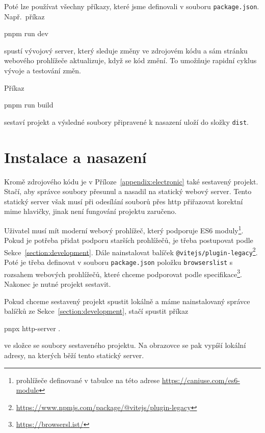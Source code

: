 Poté lze používat všechny příkazy, které jsme definovali v souboru \texttt{package.json}.
Např.~příkaz
\begin{command}
pnpm run dev
\end{command}
spustí vývojový server, který sleduje změny ve zdrojovém kódu a sám stránku webového prohlížeče aktualizuje, když se kód změní.
To umožňuje rapidní cyklus vývoje a testování změn.

Příkaz
\begin{command}
pnpm run build
\end{command}
sestaví projekt a výsledné soubory připravené k nasazení uloží do složky \texttt{dist}.

\section{Instalace a nasazení}

Kromě zdrojového kódu je v Příloze~\ref{appendix:electronic} také sestavený projekt.
Stačí, aby správce soubory přesunul a nasadil na statický webový server.
Tento statický server však musí při odesílání souborů přes \acrshort{http} přiřazovat korektní \acrshort{mime} hlavičky, jinak není fungování projektu zaručeno.

Uživatel musí mít moderní webový prohlížeč, který podporuje ES6 moduly\footnote{prohlížeče definované v tabulce na této adrese \url{https://caniuse.com/es6-module}}.
Pokud je potřeba přidat podporu starších prohlížečů, je třeba postupovat podle Sekce~\ref{section:development}.
Dále nainstalovat balíček \texttt{@vitejs/plugin-legacy}\footnote{\url{https://www.npmjs.com/package/@vitejs/plugin-legacy}}.
Poté je třeba definovat v souboru \texttt{package.json} položku \texttt{browserslist} s rozsahem webových prohlížečů, které chceme podporovat podle specifikace\footnote{\url{https://browsersl.ist/}}.
Nakonec je nutné projekt sestavit.

Pokud chceme sestavený projekt spustit lokálně a máme nainstalovaný správce balíčků ze Sekce~\ref{section:development}, stačí spustit příkaz
\begin{command}
pnpx http-server .
\end{command}
ve složce se soubory sestaveného projektu.
Na obrazovce se pak vypíší lokální adresy, na kterých běží tento statický server.
